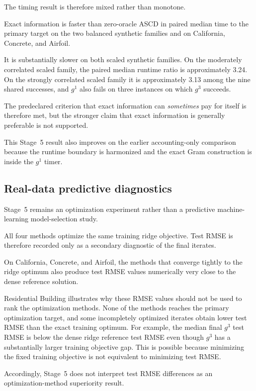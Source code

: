 \documentclass[11pt]{article}
\begin{document}
The timing result is therefore mixed rather than monotone.

Exact information is faster than zero-oracle ASCD in paired median time
to the primary target on the two balanced synthetic families and on
California, Concrete, and Airfoil.

It is substantially slower on both scaled synthetic families. On the
moderately correlated scaled family, the paired median runtime ratio is
approximately 3.24. On the strongly correlated scaled family it is
approximately 3.13 among the nine shared successes, and $g^1$ also
fails on three instances on which $g^3$ succeeds.

The predeclared criterion that exact information can
\emph{sometimes} pay for itself is therefore met, but the stronger claim
that exact information is generally preferable is not supported.

This Stage~5 result also improves on the earlier accounting-only
comparison because the runtime boundary is harmonized and the exact Gram
construction is inside the $g^1$ timer.


\subsection{Real-data predictive diagnostics}

Stage~5 remains an optimization experiment rather than a predictive
machine-learning model-selection study.

All four methods optimize the same training ridge objective. Test RMSE
is therefore recorded only as a secondary diagnostic of the final
iterates.

On California, Concrete, and Airfoil, the methods that converge tightly
to the ridge optimum also produce test RMSE values numerically very close
to the dense reference solution.

Residential Building illustrates why these RMSE values should not be
used to rank the optimization methods. None of the methods reaches the
primary optimization target, and some incompletely optimized iterates
obtain lower test RMSE than the exact training optimum. For example, the
median final $g^3$ test RMSE is below the dense ridge reference test
RMSE even though $g^3$ has a substantially larger training objective
gap. This is possible because minimizing the fixed training objective is
not equivalent to minimizing test RMSE.

Accordingly, Stage~5 does not interpret test RMSE differences as an
optimization-method superiority result.
\end{document}
